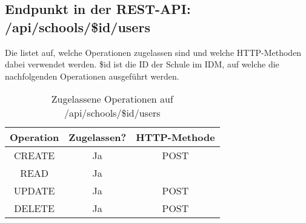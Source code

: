 \subsection{Endpunkt in der REST-API: /api/schools/\$id/users}
Die  listet auf, welche Operationen zugelassen sind und welche HTTP-Methoden dabei verwendet werden. 
\$id ist die ID der Schule im IDM, auf welche die nachfolgenden Operationen ausgeführt werden.

\begin{table}[!htbp]
	\begin{tabular}{|c|c|c|}
		\hline
			\textbf{Operation} & \textbf{Zugelassen?} & \textbf{HTTP-Methode} \\ \hline
			CREATE & Ja & POST \\ \hline 
			READ & Ja &  \\ \hline
			UPDATE & Ja & POST \\ \hline 
			DELETE & Ja & POST \\ \hline
	\end{tabular}

		\caption{Zugelassene Operationen auf /api/schools/\$id/users}
		\label{tab:rest:api:schools:id:users:meth}
\end{table}





